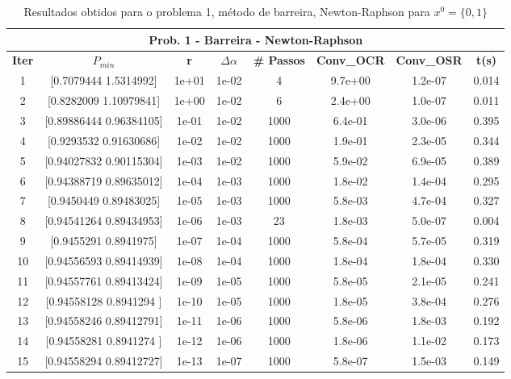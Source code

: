 \documentclass[10pt, a4paper]{article}
\begin{document}
\vspace{5mm}
\begin{table}[H]
  \begin{center}
    \begin{tabular}{c|c|c|c|c|c|c|c}
      \multicolumn{8}{c}{\textbf{Prob. 1 - Barreira - Newton-Raphson}}\\
      \hline
      \textbf{Iter} & \textbf{$P_{min}$} & \textbf{r} & $\Delta \alpha$ &\textbf{\# Passos} & \textbf{Conv\_OCR} & \textbf{Conv\_OSR} & \textbf{t(s)}\\
      \hline
        1& [0.7079444 1.5314992]& 1e+01& 1e-02 &4& 9.7e+00& 1.2e-07& 0.014         \\
        2& [0.8282009  1.10979841]& 1e+00& 1e-02 &6& 2.4e+00& 1.0e-07& 0.011\\
        3& [0.89886444 0.96384105]& 1e-01& 1e-02 &1000& 6.4e-01& 3.0e-06& 0.395\\
        4& [0.9293532  0.91630686]& 1e-02& 1e-02 &1000& 1.9e-01& 2.3e-05& 0.344\\
        5& [0.94027832 0.90115304]& 1e-03& 1e-02 &1000& 5.9e-02& 6.9e-05& 0.389\\
        6& [0.94388719 0.89635012]& 1e-04& 1e-03 &1000& 1.8e-02& 1.4e-04& 0.295\\
        7& [0.9450449  0.89483025]& 1e-05& 1e-03 &1000& 5.8e-03& 4.7e-04& 0.327\\
        8& [0.94541264 0.89434953]& 1e-06& 1e-03 &23& 1.8e-03& 5.0e-07& 0.004\\
        9& [0.9455291 0.8941975]& 1e-07& 1e-04 &1000& 5.8e-04& 5.7e-05& 0.319\\
        10& [0.94556593 0.89414939]& 1e-08& 1e-04 &1000& 1.8e-04& 1.8e-04& 0.330\\
        11& [0.94557761 0.89413424]& 1e-09& 1e-05 &1000& 5.8e-05& 2.1e-05& 0.241\\
        12& [0.94558128 0.8941294 ]& 1e-10& 1e-05 &1000& 1.8e-05& 3.8e-04& 0.276\\
        13& [0.94558246 0.89412791]& 1e-11& 1e-06 &1000& 5.8e-06& 1.8e-03& 0.192\\
        14& [0.94558281 0.8941274 ]& 1e-12& 1e-06 &1000& 1.8e-06& 1.1e-02& 0.173\\
        15& [0.94558294 0.89412727]& 1e-13& 1e-07 &1000& 5.8e-07& 1.5e-03& 0.149\\
    \end{tabular}
  \end{center}
  \caption{Resultados obtidos para o problema 1, método de barreira, Newton-Raphson para $x^0=\{0,1\}$}
\end{table}
\end{document}
